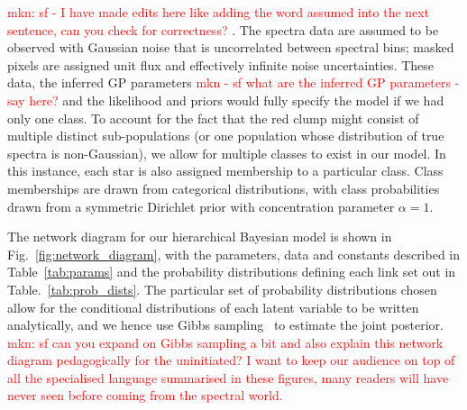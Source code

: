 \documentclass[a4paper,fleqn,usenatbib]{mnras}
\begin{document}
\textcolor{red}{mkn: sf - I have made edits here like adding the word assumed into the next sentence, can you check for correctness? }. The spectra data are assumed to be observed with Gaussian noise that is uncorrelated between spectral bins; masked pixels are assigned unit flux and effectively infinite noise uncertainties. These data, the inferred GP parameters \textcolor{red}{mkn - sf what are the inferred GP parameters - say here?}  and the likelihood and priors would fully specify the model if we had only one class. To account for the fact that the red clump might consist of multiple distinct sub-populations (or one population whose distribution of true spectra is non-Gaussian), we allow for multiple classes to exist in our model. In this instance, each star is also assigned membership to a particular class. Class memberships are drawn from categorical distributions, with class probabilities drawn from a symmetric Dirichlet prior with concentration parameter $\alpha=1$.

The network diagram for our hierarchical Bayesian model is shown in Fig.~\ref{fig:network_diagram}, with the parameters, data and constants described in Table~\ref{tab:params} and the probability distributions defining each link set out in Table.~\ref{tab:prob_dists}. The particular set of probability distributions chosen allow for the conditional distributions of each latent variable to be written analytically, and we hence use Gibbs sampling~\cite{Geman_and_Geman:1984Geman_and_Geman:1984} to estimate the joint posterior. \textcolor{red}{mkn: sf can you expand on Gibbs sampling a bit and also explain this network diagram pedagogically for the uninitiated? I want to keep our audience on top of all the specialised language summarised in these figures, many readers will have never seen before coming from the spectral world.}
\end{document}

